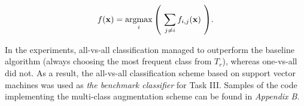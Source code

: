 \documentclass[12pt,twoside,notitlepage,amsart]{report} %
\begin{document}
	
	\begin{equation} \displaystyle f(\mathbf{x}) = \argmax_{i}{ \left( ~\sum_{j\neq i}{f_{i,j}(\mathbf{x})}~ \right)}.   \end{equation} 

	
	
	In the experiments, all-vs-all classification managed to outperform the baseline algorithm (always choosing the most frequent class from $T_r$), whereas one-vs-all {did not}. As a result, the all-vs-all classification scheme based on support vector machines was used as \emph{the benchmark classifier} for Task III. Samples of the code implementing the multi-class augmentation scheme can be found in \emph{Appendix B}.
	
	
	
	
\end{document}
